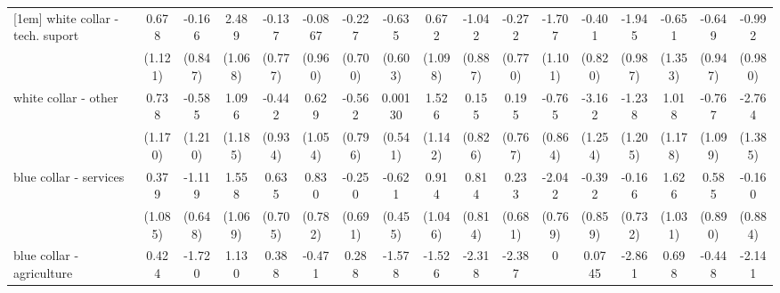 {\begin{tabular}{l*{16}{c}}
[1em]
white collar - tech. suport&       0.678         &      -0.166         &       2.489\sym{*}  &      -0.137         &     -0.0867         &      -0.227         &      -0.635         &       0.672         &      -1.042         &      -0.272         &      -1.707         &      -0.401         &      -1.945\sym{*}  &      -0.651         &      -0.649         &      -0.992         \\
                    &     (1.121)         &     (0.847)         &     (1.068)         &     (0.777)         &     (0.960)         &     (0.700)         &     (0.603)         &     (1.098)         &     (0.887)         &     (0.770)         &     (1.101)         &     (0.820)         &     (0.987)         &     (1.353)         &     (0.947)         &     (0.980)         \\
[1em]
white collar - other&       0.738         &      -0.585         &       1.096         &      -0.442         &       0.629         &      -0.562         &     0.00130         &       1.526         &       0.155         &       0.195         &      -0.765         &      -3.162\sym{*}  &      -1.238         &       1.018         &      -0.767         &      -2.764\sym{*}  \\
                    &     (1.170)         &     (1.210)         &     (1.185)         &     (0.934)         &     (1.054)         &     (0.796)         &     (0.541)         &     (1.142)         &     (0.826)         &     (0.767)         &     (0.864)         &     (1.254)         &     (1.205)         &     (1.178)         &     (1.099)         &     (1.385)         \\
[1em]
blue collar - services&       0.379         &      -1.119         &       1.558         &       0.635         &       0.830         &      -0.250         &      -0.621         &       0.914         &       0.814         &       0.233         &      -2.042\sym{**} &      -0.392         &      -0.166         &       1.626         &       0.585         &      -0.160         \\
                    &     (1.085)         &     (0.648)         &     (1.069)         &     (0.705)         &     (0.782)         &     (0.691)         &     (0.455)         &     (1.046)         &     (0.814)         &     (0.681)         &     (0.769)         &     (0.859)         &     (0.732)         &     (1.031)         &     (0.890)         &     (0.884)         \\
[1em]
blue collar - agriculture&       0.424         &      -1.720         &       1.130         &       0.388         &      -0.471         &       0.288         &      -1.578         &      -1.526         &      -2.318         &      -2.387\sym{*}  &           0         &      0.0745         &      -2.861\sym{*}  &       0.698         &      -0.448         &      -2.141         \\

\end{tabular}}
